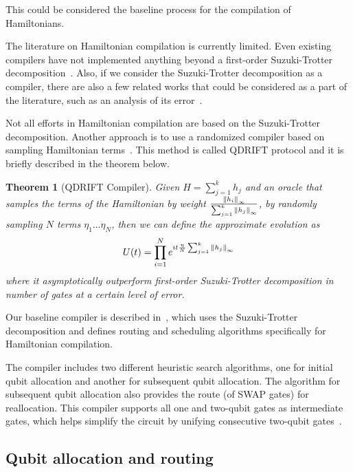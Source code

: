 \documentclass{report}
\newtheorem{theorem}{Theorem}
\begin{document}
This could be considered the baseline process for the compilation of Hamiltonians.


\cite{lao2021,campbell2019,childs2021}

The literature on Hamiltonian compilation is currently limited. Even existing compilers have not implemented anything beyond a first-order Suzuki-Trotter decomposition~\cite{sivarajah2021, qiskit2023}. Also, if we consider the Suzuki-Trotter decomposition as a compiler, there are also a few related works that could be considered as a part of the literature, such as an analysis of its error~\cite{childs2021}.

Not all efforts in Hamiltonian compilation are based on the Suzuki-Trotter decomposition. Another approach is to use a randomized compiler based on sampling Hamiltonian terms~\cite{campbell2019}. This method is called QDRIFT protocol and it is briefly described in the theorem below.

\begin{theorem}[QDRIFT Compiler]
  Given $H = \sum_{j=1}^k h_j$ and an oracle that samples the terms of the Hamiltonian by weight $\frac{\norm{h_i}_\infty}{\sum_{j=1}^k \norm{h_j}_\infty}$, by randomly sampling $N$ terms $\eta_1 \dots \eta_N$, then we can define the approximate evolution as
  \begin{equation}
    U(t) = \prod_{i=1}^N e^{it\frac{\eta}{N}\sum_{j=1}^k \norm{h_j}_\infty}
  \end{equation}
  where it asymptotically outperform first-order Suzuki-Trotter decomposition in number of gates at a certain level of error.
\end{theorem}

Our baseline compiler is described in~\cite{lao2021}, which uses the Suzuki-Trotter decomposition and defines routing and scheduling algorithms specifically for Hamiltonian compilation.

The compiler includes two different heuristic search algorithms, one for initial qubit allocation and another for subsequent qubit allocation. The algorithm for subsequent qubit allocation also provides the route (of SWAP gates) for reallocation. This compiler supports all one and two-qubit gates as intermediate gates, which helps simplify the circuit by unifying consecutive two-qubit gates~\cite{lao2021}.


\subsection{Qubit allocation and routing}
\end{document}
